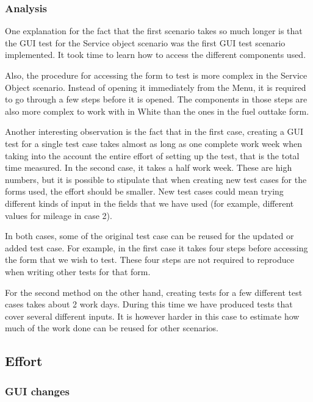 \documentclass{article}
\begin{document}
			\subsubsection{Analysis}

			One explanation for the fact that the first scenario takes so much longer is that the GUI test for the Service object scenario was the first GUI test scenario implemented. It took time to learn how to access the different components used. 

			Also, the procedure for accessing the form to test is more complex in the Service Object scenario. Instead of opening it immediately from the Menu, it is required to go through a few steps before it is opened. The components in those steps are also more complex to work with in White than the ones in the fuel outtake form.
			
			Another interesting observation is the fact that in the first case, creating a GUI test for a single test case takes almost as long as one complete work week when taking into the account the entire effort of setting up the test, that is the total time measured. In the second case, it takes a half work week. These are high numbers, but it is possible to stipulate that when creating new test cases for the forms used, the effort should be smaller. New test cases could mean trying
			different kinds of input in the fields that we have used (for example, different values for mileage in case 2). 

			In both cases, some of the original test case can be reused for the updated or added test case. For example, in the first case it takes four steps before accessing the form that we wish to test. These four steps are not required to reproduce when writing other tests for that form.
			
			For the second method on the other hand, creating tests for a few different test cases takes about 2 work days. During this time we have produced tests that cover several different inputs. It is however harder in this case to estimate how much of the work done can be reused for other scenarios.


		\subsection{Effort}

			\subsubsection{GUI changes}
\end{document}
